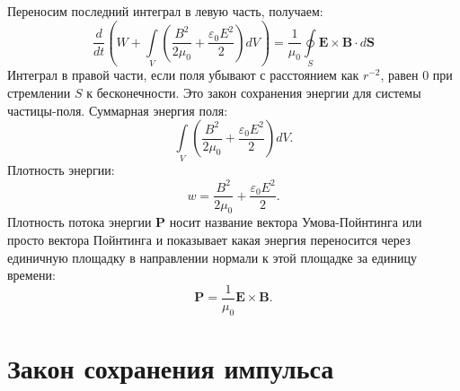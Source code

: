 \documentclass[a4paper,14pt]{extreport} %
\newcommand{\Df}[1]{\frac{d}{d #1}}
\renewcommand{\vec}[1]{\boldsymbol{#1}}
\newcommand{\eps}{\varepsilon}
\begin{document}
	Переносим последний интеграл в левую часть, получаем:
	\begin{equation*}
		\Df{t} 
		\left(
			W + \int\limits_{V} \left( \frac{B^2}{2\mu_0} + \frac{\eps_0 E^2}{2}\right) dV
		\right) =
		\frac{1}{\mu_0} \oint\limits_{S} \vec{E}\times\vec{B}\cdot d\vec{S}
	\end{equation*}
	Интеграл в правой части, если поля убывают с расстоянием как $r^{-2}$, равен 0 при стремлении $S$ к бесконечности. Это закон сохранения энергии для системы частицы-поля. Суммарная энергия поля:
	\begin{equation*}
		\int\limits_{V} \left( \frac{B^2}{2\mu_0} + \frac{\eps_0 E^2}{2}\right) dV.
	\end{equation*}
	Плотность энергии:
	\begin{equation*}
		w = \frac{B^2}{2\mu_0} + \frac{\eps_0 E^2}{2}.
	\end{equation*}
	Плотность потока энергии $\vec{P}$ носит название вектора Умова-Пойнтинга или просто вектора Пойнтинга и показывает какая энергия переносится через единичную площадку в направлении нормали к этой площадке за единицу времени:
	\begin{equation*}
		\vec{P} = \frac{1}{\mu_0} \vec{E}\times\vec{B}.
	\end{equation*}
	
	\section{Закон сохранения импульса}
	
\end{document}
